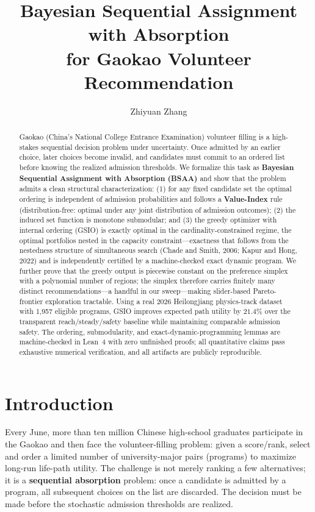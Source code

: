 \documentclass[11pt,a4paper]{article}
\title{Bayesian Sequential Assignment with Absorption\\for Gaokao Volunteer Recommendation}
\author{Zhiyuan Zhang}
\date{}
\begin{document}
\maketitle

\begin{abstract}
Gaokao (China's National College Entrance Examination) volunteer filling is a high-stakes sequential decision problem under uncertainty. Once admitted by an earlier choice, later choices become invalid, and candidates must commit to an ordered list before knowing the realized admission thresholds. We formalize this task as \textbf{Bayesian Sequential Assignment with Absorption (BSAA)} and show that the problem admits a clean structural characterization: (1) for any fixed candidate set the optimal ordering is independent of admission probabilities and follows a \textbf{Value-Index} rule (distribution-free: optimal under any joint distribution of admission outcomes); (2) the induced set function is monotone submodular; and (3) the greedy optimizer with internal ordering (GSIO) is exactly optimal in the cardinality-constrained regime, the optimal portfolios nested in the capacity constraint---exactness that follows from the nestedness structure of simultaneous search (Chade and Smith, 2006; Kapur and Hong, 2022) and is independently certified by a machine-checked exact dynamic program. We further prove that the greedy output is piecewise constant on the preference simplex with a polynomial number of regions; the simplex therefore carries finitely many distinct recommendations---a handful in our sweep---making slider-based Pareto-frontier exploration tractable. Using a real 2026 Heilongjiang physics-track dataset with 1,957 eligible programs, GSIO improves expected path utility by $21.4\%$ over the transparent reach/steady/safety baseline while maintaining comparable admission safety. The ordering, submodularity, and exact-dynamic-programming lemmas are machine-checked in Lean~4 with zero unfinished proofs; all quantitative claims pass exhaustive numerical verification, and all artifacts are publicly reproducible.
\end{abstract}

\section{Introduction}\label{sec:intro}

Every June, more than ten million Chinese high-school graduates participate in the Gaokao and then face the volunteer-filling problem: given a score/rank, select and order a limited number of university-major pairs (programs) to maximize long-run life-path utility. The challenge is not merely ranking a few alternatives; it is a \textbf{sequential absorption} problem: once a candidate is admitted by a program, all subsequent choices on the list are discarded. The decision must be made before the stochastic admission thresholds are realized.
\end{document}
